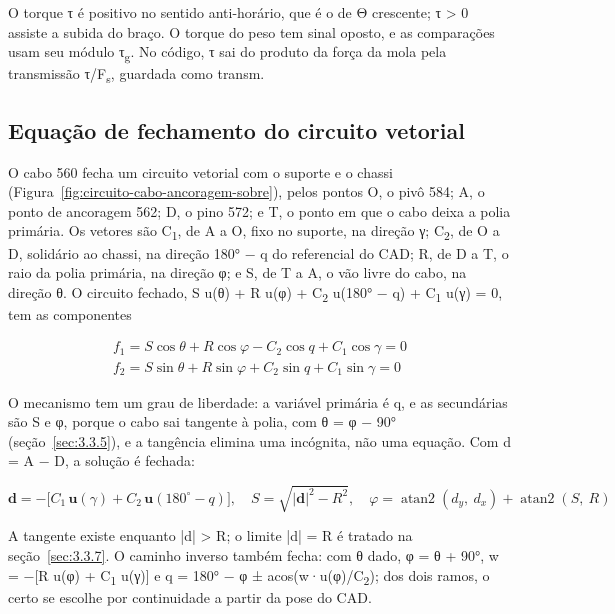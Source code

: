 O torque τ é positivo no sentido anti-horário, que é o de Θ crescente; τ > 0 assiste a subida do braço. O torque do peso tem sinal oposto, e as comparações usam seu módulo τ\textsubscript{g}. No código, τ sai do produto da força da mola pela transmissão τ/F\textsubscript{s}, guardada como transm.

\subsection{Equação de fechamento do circuito vetorial}\label{sec:3.3.4}

O cabo 560 fecha um circuito vetorial com o suporte e o chassi (Figura~\ref{fig:circuito-cabo-ancoragem-sobre}), pelos pontos O, o pivô 584; A, o ponto de ancoragem 562; D, o pino 572; e T, o ponto em que o cabo deixa a polia primária. Os vetores são C\textsubscript{1}, de A a O, fixo no suporte, na direção γ; C\textsubscript{2}, de O a D, solidário ao chassi, na direção 180° − q do referencial do CAD; R, de D a T, o raio da polia primária, na direção φ; e S, de T a A, o vão livre do cabo, na direção θ. O circuito fechado, S u(θ) + R u(φ) + C\textsubscript{2} u(180° − q) + C\textsubscript{1} u(γ) = 0, tem as componentes

\begin{gather}
  f_{1} = S\cos\theta + R\cos\varphi - C_{2}\cos q + C_{1}\cos\gamma = 0 \label{eq:56} \\
  f_{2} = S\sin\theta + R\sin\varphi + C_{2}\sin q + C_{1}\sin\gamma = 0 \label{eq:57}
\end{gather}

O mecanismo tem um grau de liberdade: a variável primária é q, e as secundárias são S e φ, porque o cabo sai tangente à polia, com θ = φ − 90° (seção~\ref{sec:3.3.5}), e a tangência elimina uma incógnita, não uma equação. Com d = A − D, a solução é fechada:

\begin{equation}
  \mathbf{d} = - \lbrack C_{1}\,\mathbf{u}(\gamma) + C_{2}\,\mathbf{u}(180^{\circ} - q)\rbrack,\quad S = \sqrt{\left| \mathbf{d} \right|^{2} - R^{2}},\quad\varphi = \operatorname{atan2}{(d_{y},\ d_{x})} + \operatorname{atan2}{(S,\ R)}
  \label{eq:58}
\end{equation}

A tangente existe enquanto |d| > R; o limite |d| = R é tratado na seção~\ref{sec:3.3.7}. O caminho inverso também fecha: com θ dado, φ = θ + 90°, w = −[R u(φ) + C\textsubscript{1} u(γ)] e q = 180° − φ ± acos(w·u(φ)/C\textsubscript{2}); dos dois ramos, o certo se escolhe por continuidade a partir da pose do CAD.

